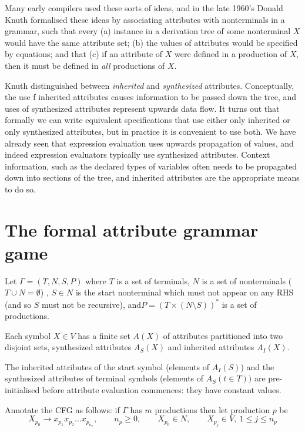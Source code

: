 Many early compilers used these sorts of ideas, and in the late 1960's Donald Knuth formalised these ideas by associating attributes with nonterminals in a grammar, such that every (a) instance in a derivation tree of some nonterminal $X$ would have the same attribute set; (b) the values of attributes would be specified by equations; and that (c) if an attribute of $X$ were defined in a production of $X$, then it must be defined in {\em all} productions of $X$.

Knuth distinguished between {\em inherited} and {\em synthesized} attributes. Conceptually, the use f inherited attributes causes information to be passed down the tree, and uses of synthesized attributes represent upwards data flow. It turns out that formally we can write equivalent specifications that use either only inherited or only synthesized attributes, but in practice it is convenient to use both. We have already seen that expression evaluation uses upwards propagation of values, and indeed expression evaluators typically use synthesized attributes. Context information, such as the declared types of variables often needs to be propagated down into sections of the tree, and inherited attributes are the appropriate means to do so.

\section{The formal attribute grammar game}

Let $\Gamma = (T, N, S, P)$ where $T$ is a set of
terminals, $N$ is a set of nonterminals ($T\cup N=\emptyset$)
, $S\in N$ is the
start nonterminal which must not appear on any RHS (and so $S$ must not be recursive), and$P = (T \times
(N\setminus S))^*$ is a set of productions.

Each symbol $X \in V$ has a finite set $A(X)$ of attributes partitioned into two disjoint sets, synthesized attributes $A_S(X)$ and inherited attributes $A_I(X)$.

The inherited attributes of the start symbol (elements of $A_I(S)$) and the synthesized attributes of terminal symbols (elements of $A_S(t\in T))$ are pre-initialised before attribute evaluation commences: they have constant values. 

Annotate the CFG as follows: if $\Gamma$ has $m$ productions then let production $p$ be\[X_{p_0} \rightarrow x_{p_1} x_{p_2} \ldots x_{p_{n_p}}, \qquad n_p \ge 0, \qquad X_{p_0} \in N, \qquad X_{p_j} \in V,\ 1 \le j \le n_p\] 

